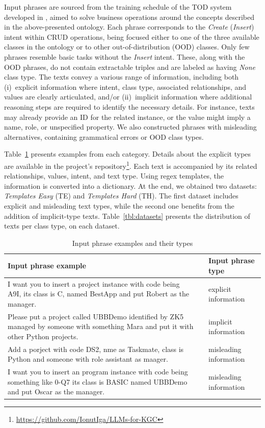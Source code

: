 \documentclass[runningheads]{llncs}
\begin{document}
Input phrases are sourced from the training schedule of the TOD system developed in \cite{iga2023}, aimed to solve business operations around the concepts described in the above-presented ontology. Each phrase corresponds to the \textit{Create}  (\textit{Insert}) intent within CRUD operations, being focused either to one of the three available classes in the ontology or to other out-of-distribution (OOD) classes. Only few phrases resemble basic tasks without the \textit{Insert} intent. These, along with the OOD phrases, do not contain extractable triples and are labeled as having \textit{None} class type. The texts convey a various range of information, including both (i)~explicit information where intent, class type, associated relationships, and values are clearly articulated, and/or (ii)~implicit information where additional reasoning steps are required to identify the necessary details. For instance, texts may already provide an ID for the related instance, or the value might imply a name, role, or unspecified property. We also constructed phrases with misleading alternatives, containing grammatical errors or OOD class types. 

Table~\ref{tbl:examples} presents examples from each category. Details about the explicit types are available in the project’s repository\footnote{\url{https://github.com/IonutIga/LLMs-for-KGC}}.
Each text is accompanied by its related relationships, values, intent, and text type. Using regex templates, the information is converted into a dictionary. At the end, we obtained two datasets: \emph{Templates Easy} (TE) and \emph{Templates Hard} (TH). The first dataset  includes explicit and misleading text types, while the second one benefits from the addition of implicit-type  texts. 
Table~\ref{tbl:datasets} presents the distribution of texts per class type, on each dataset.

\begin{table}[!tb]
\caption{Input phrase examples and their types}
\scriptsize
\begin{tabular}{p{8.8cm}p{0.3cm}l}
\hline \hline
\textbf{Input phrase example} & & \textbf{Input phrase type} \\
\hline \hline
I want you to insert a project instance with code being A9I, its class is C, named BestApp and put Robert as the manager. & &	explicit information \\ \hline
Please put a project called UBBDemo identified by ZK5 managed by someone with something Mara and put it with other Python projects. & &	implicit information \\ \hline
Add a porject with code DS2, nme as Taskmate, class is Python and someone with role assistant as maager. & &	misleading information \\ \hline
I want you to insert an program instance with code being something like 0-Q7 its class is BASIC named UBBDemo and put Oscar as the manager. & &	misleading information \\
\hline \hline
\end{tabular}
\label{tbl:examples}
\end{table}
\end{document}
